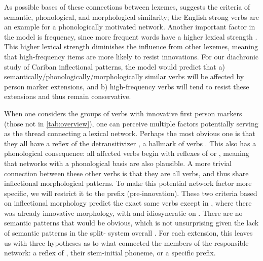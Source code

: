 As possible bases of these connections between lexemes, \textcite[118]{bybee1985morphology} suggests the criteria of semantic, phonological, and morphological similarity; the English strong verbs are an example for a phonologically motivated network.
Another important factor in the model is frequency, since more frequent words have a higher lexical strength \parencite[119]{bybee1985morphology}.
This higher lexical strength diminishes the influence from other lexemes, meaning that high-frequency items are more likely to resist innovations.
For our diachronic study of Cariban inflectional patterns, the model would predict that a) semantically\slash{}phonologically\slash\hspace{0pt}morphologically similar verbs will be affected by person marker extensions, and b) high-frequency verbs will tend to resist these extensions and thus remain conservative.

When one considers the groups of verbs with innovative first person markers (those not in \cref{tab:overview}), one can perceive multiple factors potentially serving as the thread connecting a lexical network.
Perhaps the most obvious one is that they all have a reflex of the detransitivizer \detrz, a hallmark of  verbs .
This also has a phonological consequence: all affected  verbs begin with reflexes of  or , meaning that networks with a phonological basis are also plausible.
A more trivial connection between these other verbs is that they are all  verbs, and thus share inflectional morphological patterns.
To make this potential network factor more specific, we will restrict it to the  prefix (pre-innovation).
These two criteria based on inflectional morphology predict the exact same verbs except in \akuriyo, where there was already innovative  morphology, with  and idiosyncratic  on .
There are no semantic patterns that would be obvious, which is not unsurprising given the lack of semantic patterns in the split- system overall .
For each extension, this leaves us with three hypotheses as to what connected the members of the responsible network: a reflex of , their stem-initial phoneme, or a specific  prefix.

